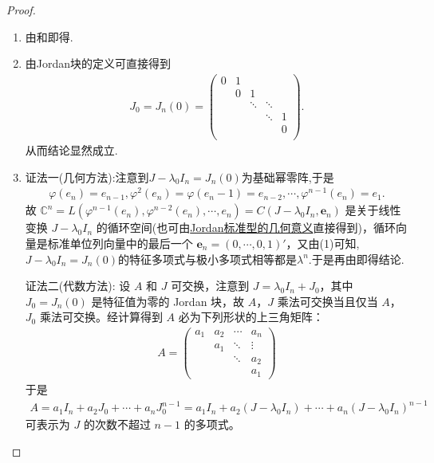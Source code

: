 \documentclass[../../main.tex]{subfiles}
\begin{document}
\begin{proof}
\begin{enumerate}[(1)]
\item 由和即得.

\item 由Jordan块的定义可直接得到
\begin{align*}
J_0=J_n(0)=\left( \begin{matrix}
0&		1&		&		&		\\
&		0&		1&		&		\\
&		&		\ddots&		\ddots&		\\
&		&		&		\ddots&		1\\
&		&		&		&		0\\
\end{matrix} \right) .
\end{align*}
从而结论显然成立.

\item {\color{blue}证法一(几何方法):}注意到$J-\lambda_0I_n=J_n(0)$为基础幂零阵,于是
\begin{align*}
\varphi(e_n)=e_{n-1},\varphi^2(e_n)=\varphi(e_n-1)=e_{n-2},\cdots,\varphi^{n-1}(e_n)=e_1.
\end{align*}
故
$\mathbb{C}^n =L(\varphi^{n-1}(e_n),\varphi^{n-2}(e_n),\cdots,e_n)=C(J - \lambda_0I_n, \boldsymbol{e}_n)$ 是关于线性变换 $J - \lambda_0I_n$ 的循环空间(也可由\hyperref[theorem:Jordan标准型的几何意义]{Jordan标准型的几何意义}直接得到)，循环向量是标准单位列向量中的最后一个 $\boldsymbol{e}_n = (0, \cdots, 0, 1)'$，又由(1)可知,$J-\lambda_0I_n=J_n(0)$的特征多项式与极小多项式相等都是$\lambda^n$.于是再由即得结论.

{\color{blue}证法二(代数方法):}
设 $A$ 和 $J$ 可交换，注意到 $J = \lambda_0I_n + J_0$，其中 $J_0 = J_n(0)$ 是特征值为零的 Jordan 块，故 $A$，$J$ 乘法可交换当且仅当 $A$，$J_0$ 乘法可交换。经计算得到 $A$ 必为下列形状的上三角矩阵：
\begin{align*}
A = \begin{pmatrix}
a_1 & a_2 & \cdots & a_n \\
& a_1 & \ddots & \vdots \\
& & \ddots & a_2 \\
& & & a_1
\end{pmatrix}
\end{align*}
于是
\begin{align*}
A = a_1I_n + a_2J_0 + \cdots + a_nJ_0^{n - 1} = a_1I_n + a_2(J - \lambda_0I_n) + \cdots + a_n(J - \lambda_0I_n)^{n - 1}
\end{align*}
可表示为 $J$ 的次数不超过 $n - 1$ 的多项式。 


\end{enumerate}
\end{proof}
\end{document}
